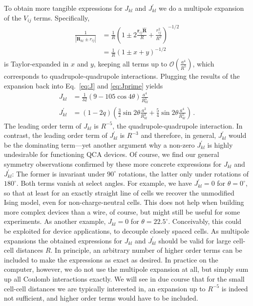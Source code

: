 To obtain more tangible expressions for $J_{kl}$ and $J^{\prime}_{kl}$ we do a
multipole expansion of the $V_{ij}$ terms. Specifically,
%
\begin{equation}
\begin{split}
  \frac{1}{\left| \bm{R}_{kl} \pm r_{ij} \right|}
  &=
  \frac{1}{R}
  \left( 
    1 \pm 2 \frac{\bm{r}_{ij} \hat{\bm{R}}}{R} + \frac{r_{ij}^2}{R^2}
  \right)^{-1/2} \\
  &=
  \frac{1}{R} \left( 1 \pm x + y \right)^{-1/2}
\end{split}
\end{equation}
%
is Taylor-expanded in $x$ and $y$, keeping all terms up to
$\mathcal{O}\left(\frac{a^4}{R^5}\right)$, which corresponds to
quadrupole-quadrupole interactions. Plugging the results of the expansion back
into Eq.~\eqref{eq:J} and \eqref{eq:Jprime} yields
%
\begin{align}
  \label{eq:J_}
  J_{kl}
  &=
  \frac{ 1 }{ 32 }
  \left(
    9 - 105 \cos{4 \theta}
  \right)
  \frac{ a^4 }{ R_{kl}^5 }
  \\
  \label{eq:Jprime_}
  J^{\prime}_{kl}
  &=
  \left( 1 - 2 q \right)
  \left(
    \frac{ 3 }{ 2 } \sin{2 \theta} \frac{ a^2 }{ R_{kl}^3 } +
    \frac{ 5 }{ 4 } \sin{2 \theta} \frac{ a^4 }{ R_{kl}^5 }
  \right) \, .
\end{align}
%
The leading order term of $J_{kl}$ is $R^{-5}$, the quadrupole-quadrupole
interaction. In contrast, the leading order term of $J^{\prime}_{kl}$ is
$R^{-3}$ and therefore, in general, $J^{\prime}_{kl}$ would be the dominating
term---yet another argument why a non-zero $J^{\prime}_{kl}$ is highly
undesirable for functioning QCA devices. Of course, we find our general symmetry
observations confirmed by these more concrete expressions for $J_{kl}$ and
$J^{\prime}_{kl}$: The former is invariant under $90^{\circ}$ rotations, the
latter only under rotations of $180^{\circ}$. Both terms vanish at select
angles. For example, we have $J^{\prime}_{kl} = 0$ for $\theta = 0^{\circ}$, so
that at least for an exactly straight line of cells we recover the unmodified
Ising model, even for non-charge-neutral cells. This does not help when building
more complex devices than a wire, of course, but might still be useful for some
experiments. As another example, $J_{kl} = 0$ for $\theta = 22.5^{\circ}$.
Conceivably, this could be exploited for device applications, to decouple
closely spaced cells. As multipole expansions the obtained expressions for
$J_{kl}$ and $J^{\prime}_{kl}$ should be valid for large cell-cell distances
$R$. In principle, an arbitrary number of higher order terms can be included to
make the expressions as exact as desired. In practice on the computer, however,
we do not use the multipole expansion at all, but simply sum up all Coulomb
interactions exactly. We will see in due course that for the small cell-cell
distances we are typically interested in, an expansion up to $R^{-5}$ is indeed
not sufficient, and higher order terms would have to be included.


